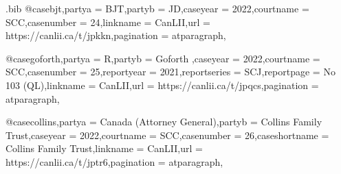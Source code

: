 
\begin{filecontents*}[overwrite]{\jobname.bib}
@case{bjt,partya = {BJT},partyb = {JD},caseyear = {2022},courtname = {SCC},casenumber = {24},linkname = {CanLII},url = {https://canlii.ca/t/jpkkn},pagination = {atparagraph},}

@case{goforth,partya = {R},partyb = {Goforth },caseyear = {2022},courtname = {SCC},casenumber = {25},reportyear = {2021},reportseries = {SCJ},reportpage = {No 103 (QL)},linkname = {CanLII},url = {https://canlii.ca/t/jpqcs},pagination = {atparagraph},}

@case{collins,partya = {Canada (Attorney General)},partyb = {Collins Family Trust},caseyear = {2022},courtname = {SCC},casenumber = {26},caseshortname = {Collins Family Trust},linkname = {CanLII},url = {https://canlii.ca/t/jptr6},pagination = {atparagraph},}



\end{filecontents*}



\documentclass{article}
\newcommand\rulesep{\rule{0.4\textwidth}{.4pt}}

\usepackage[table,dvipsnames,svgnames]{xcolor}
\pagecolor{blue!3}
\usepackage{fontspec}
\setmainfont{Noto Serif}
\setsansfont{TeX Gyre Adventor}[Scale=1.2]%
\setmonofont{Noto Sans Mono}%
\newfontface{}[Colour=blue]
\newcommand\circnum[1]{{\fcircnum#1}}
\usepackage[british]{babel}
\usepackage{csquotes}
\usepackage{graphicx}

\usepackage{marginnote}
\usepackage{microtype}
\usepackage{parskip}
\newcommand\defaultparskip{\setlength\parskip{0pt}}
\newcommand\normalparskip{\parskip=.5\baselineskip plus 2pt\relax}

\usepackage{splitidx}



\newcommand\theadcolour{\rowcolor{blue!80!green!20!yellow}}

\newcommand\note[1]{(\texttt{#1})}



	\newcommand\abibname{lawcitemini}
	\newcommand\abibstyle{style=\abibname}
	\usepackage[
	\abibstyle , 
	lawcitestyle=mcgill,
	indexing=cite,
	citetracker=true,
	citecounter=context,
	pagetracker=true,
	idemtracker=true,
	opcittracker=true,
	loccittracker=true,%
	autocite=footnote,
	   datezeros=true,
	   minnames=5,
	   maxnames=5,%
	   dashed=false,
	   loadfiles=true,%
	]{biblatex}

